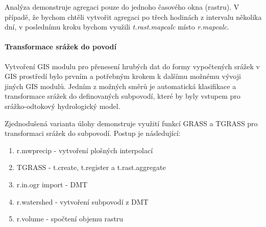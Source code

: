 \documentclass[a4paper,12pt,oneside]{report}
\begin{document}
Analýza demonstruje agregaci pouze do jednoho časového okna (rastru). V případě, že bychom chtěli vytvořit  agregaci po třech hodinách z intervalu několika dní, v poslednímu kroku bychom využili \textit{t.rast.mapcalc} místo \textit{r.mapcalc}.

\paragraph*{Transformace srážek do povodí}
Vytvoření GIS modulu pro přenesení hrubých dat do formy vypočtených srážek v GIS prostředí bylo prvním a potřebným krokem k dalšímu možnému vývoji jiných GIS modulů. Jedním z možných směrů je automatická klasifikace a transformace srážek do definovaných subpovodí, které by byly vstupem pro srážko-odtokový hydrologický model.

Zjednodušená varianta úlohy demonstruje využití funkcí GRASS a TGRASS pro transformaci srážek do subpovodí. Postup je následující:

\begin{enumerate}
\item r.mwprecip - vytvoření plošných interpolací
\item TGRASS - t.create, t.register a t.rast.aggregate
\item r.in.ogr import - \acs{DMT}
\item r.watershed -  vytvoření subpovodí z DMT
\item r.volume - spočtení objemu rastru
\end{enumerate}
\end{document}

